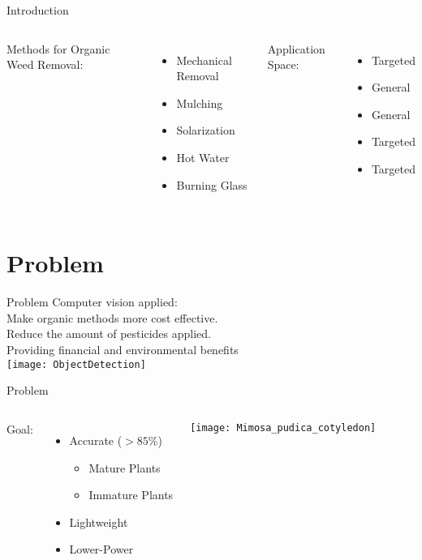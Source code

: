 \documentclass{beamer}
\begin{document}
\begin{frame}{Introduction}
	\begin{columns}
		Methods for Organic Weed Removal:
		\begin{itemize}
			\item Mechanical Removal
			\item Mulching
			\item Solarization
			\item Hot Water
			\item Burning Glass
		\end{itemize}
	
		\vspace{1em}
		Application Space:
		\begin{itemize}
			\item Targeted
			\item General
			\item General
			\item Targeted
			\item Targeted
		\end{itemize}
	\end{columns}
\end{frame}

\section[Problem]{Problem}

\begin{frame}{Problem}
	Computer vision applied: \\
	Make organic methods more cost effective. \\
	Reduce the amount of pesticides applied. \\ \vspace{1em}
	Providing financial and environmental benefits \\
	\centering
	\texttt{[image: ObjectDetection]}
\end{frame}

\begin{frame}{Problem}
	\begin{columns}
		\column{0.5\textwidth}
		Goal:
		\begin{itemize}
			\item Accurate ($>85\%$)
			\begin{itemize}
				\item Mature Plants
				\item Immature Plants
			\end{itemize}
			\item Lightweight
			\item Lower-Power
		\end{itemize}
		\column{0.5\textwidth}
		\texttt{[image: Mimosa\_pudica\_cotyledon]}
	\end{columns}
\end{frame}
\end{document}
